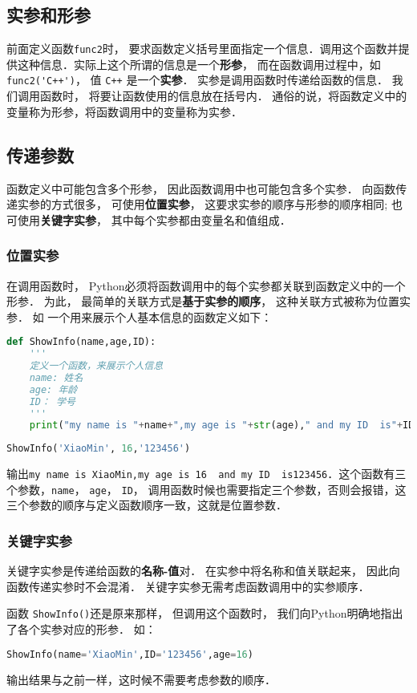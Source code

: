 \subsection{实参和形参}
前面定义函数\verb|func2|时， 要求函数定义括号里面指定一个信息．调用这个函数并提供这种信息．实际上这个所谓的信息是一个\textbf{形参}， 而在函数调用过程中，如\verb|func2('C++')|， 值 \verb|C++| 是一个\textbf{实参}． 实参是调用函数时传递给函数的信息． 我们调用函数时， 将要让函数使用的信息放在括号内． 通俗的说，将函数定义中的变量称为形参，将函数调用中的变量称为实参．

\subsection{传递参数}
函数定义中可能包含多个形参， 因此函数调用中也可能包含多个实参． 向函数传递实参的方式很多， 可使用\textbf{位置实参}， 这要求实参的顺序与形参的顺序相同; 也可使用\textbf{关键字实参}， 其中每个实参都由变量名和值组成．
\subsubsection{位置实参}
在调用函数时， Python必须将函数调用中的每个实参都关联到函数定义中的一个形参． 为此， 最简单的关联方式是\textbf{基于实参的顺序}， 这种关联方式被称为位置实参． 如
一个用来展示个人基本信息的函数定义如下：
\begin{lstlisting}[language=python]
def ShowInfo(name,age,ID):
    '''
    定义一个函数，来展示个人信息
    name: 姓名
    age: 年龄
    ID： 学号
    '''
    print("my name is "+name+",my age is "+str(age)," and my ID  is"+ID)
\end{lstlisting}
\begin{lstlisting}[language=python]
ShowInfo('XiaoMin', 16,'123456')
\end{lstlisting}
输出\verb|my name is XiaoMin,my age is 16  and my ID  is123456|．这个函数有三个参数，\verb|name|， \verb|age|， \verb|ID|， 调用函数时候也需要指定三个参数，否则会报错，这三个参数的顺序与定义函数顺序一致，这就是位置参数．
\subsubsection{关键字实参}
关键字实参是传递给函数的\textbf{名称-值}对． 在实参中将名称和值关联起来， 因此向函数传递实参时不会混淆． 关键字实参无需考虑函数调用中的实参顺序．

函数 \verb|ShowInfo()|还是原来那样， 但调用这个函数时， 我们向Python明确地指出了各个实参对应的形参． 如：
\begin{lstlisting}[language=python]
ShowInfo(name='XiaoMin',ID='123456',age=16)
\end{lstlisting}
输出结果与之前一样，这时候不需要考虑参数的顺序．

